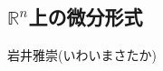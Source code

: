 \documentclass[dvipdfmx,a4paper,11pt]{article}
\newcommand{\R}{\mathbb{R}}
\theoremstyle{definition}
\newcommand{\pdrv}[2]{\frac{\partial #1}{\partial #2}}
\newcommand{\drv}[2]{\frac{d #1}{d#2}}
\begin{document}

\newpage



\begin{center}
\section{$\R^n$上の微分形式}
\label{sec-Rn-diff}
\end{center}
\begin{flushright}
 岩井雅崇(いわいまさたか)
\end{flushright}
\end{document}
